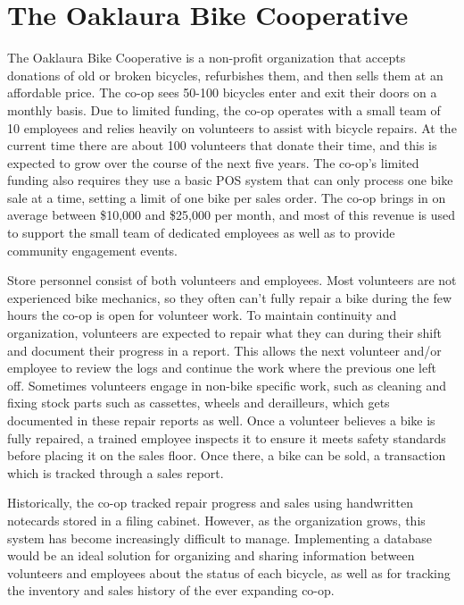 \documentclass{article}
\begin{document}
\section{The Oaklaura Bike Cooperative}

\begin{tcolorbox}[colback=secondarycolor, colframe=primarycolor, arc=5mm]
\begingroup
\large
The Oaklaura Bike Cooperative is a non-profit organization that accepts donations of old or broken bicycles, refurbishes them, and then sells them at an affordable price. The co-op sees 50-100 bicycles enter and exit their doors on a monthly basis. Due to limited funding, the co-op operates with a small team of 10 employees and relies heavily on volunteers to assist with bicycle repairs. At the current time there are about 100 volunteers that donate their time, and this is expected to grow over the course of the next five years. The co-op’s limited funding also requires they use a basic POS system that can only process one bike sale at a time, setting a limit of one bike per sales order. The co-op brings in on average between \$10,000 and \$25,000 per month, and most of this revenue is used to support the small team of dedicated employees as well as to provide community engagement events. 

\vspace{0.2cm}

Store personnel consist of both volunteers and employees. Most volunteers are not experienced bike mechanics, so they often can't fully repair a bike during the few hours the co-op is open for volunteer work. To maintain continuity and organization, volunteers are expected to repair what they can during their shift and document their progress in a report. This allows the next volunteer and/or employee to review the logs and continue the work where the previous one left off. Sometimes volunteers engage in non-bike specific work, such as cleaning and fixing stock parts such as cassettes, wheels and derailleurs, which gets documented in these repair reports as well. Once a volunteer believes a bike is fully repaired, a trained employee inspects it to ensure it meets safety standards before placing it on the sales floor. Once there, a bike can be sold, a transaction which is tracked through a sales report.

\vspace{0.2cm}

Historically, the co-op tracked repair progress and sales using handwritten notecards stored in a filing cabinet. However, as the organization grows, this system has become increasingly difficult to manage. Implementing a database would be an ideal solution for organizing and sharing information between volunteers and employees about the status of each bicycle, as well as for tracking the inventory and sales history of the ever expanding co-op.

\endgroup
\end{tcolorbox}
\end{document}
